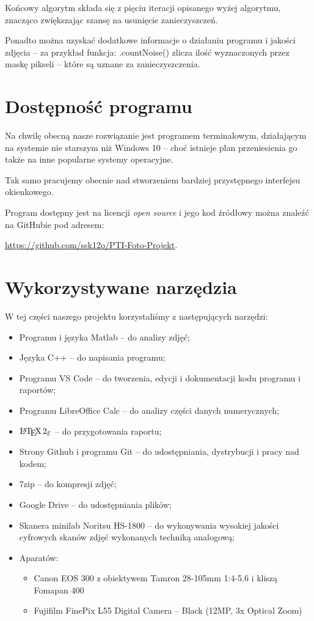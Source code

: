 \documentclass[]{mwart}
\begin{document}
Końcowy algorytm składa się z pięciu iteracji opisanego wyżej algorytmu,
znacząco zwiększając szansę na usunięcie zanieczyszczeń.

Ponadto można uzyskać dodatkowe informacje o działaniu programu
i jakości zdjęcia -- za przykład funkcja: .countNoise()
zlicza ilość wyznaczonych przez maskę pikseli -- które są uznane za zanieczyszczenia.





\section{Dostępność programu}
Na chwilę obecną nasze rozwiązanie jest programem terminalowym,
działającym na systemie nie starszym niż Windows 10 -- choć istnieje
plan przeniesienia go także na inne popularne systemy operacyjne.

Tak samo pracujemy obecnie nad stworzeniem bardziej przystępnego interfejsu okienkowego.

Program dostępny jest na licencji \textit{open source} i jego kod źródłowy można znaleźć na GitHubie
pod adresem:
\begin{center}
    \url{https://github.com/ssk12o/PTI-Foto-Projekt}.
\end{center}




\newpage
\section{Wykorzystywane narzędzia}
W tej części naszego projektu korzystaliśmy z następujących narzędzi:
\begin{itemize}
    \item Programu i języka Matlab -- do analizy zdjęć;
    \item Języka C++ -- do napisania programu;
    \item Programu VS Code -- do tworzenia, edycji i dokumentacji kodu programu i raportów;
    \item Programu LibreOffice Calc -- do analizy części danych numerycznych;
    \item $\LaTeXe{}$ -- do przygotowania raportu;
    \item Strony Github i programu Git -- do udostępniania, dystrybucji i pracy nad kodem;
    \item 7zip -- do kompresji zdjęć;
    \item Google Drive -- do udostępniania plików;
    \item Skanera minilab Noritsu HS-1800 -- do wykonywania wysokiej jakości cyfrowych skanów zdjęć wykonanych techniką analogową;
    \item Aparatów:
          \begin{itemize}
              \item Canon EOS 300 z obiektywem Tamron 28-105mm 1:4-5.6 i kliszą Fomapan 400
              \item Fujifilm FinePix L55 Digital Camera -- Black (12MP, 3x Optical Zoom)
          \end{itemize}
\end{itemize}
\end{document}
